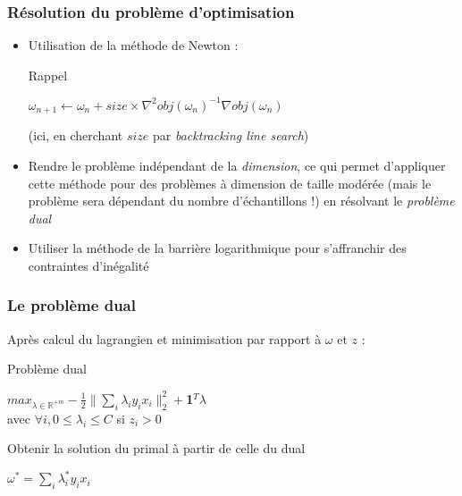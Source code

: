 \documentclass{beamer}
\begin{document}
\begin{frame}
\frametitle{Résolution du problème d'optimisation}

\begin{itemize}
\item Utilisation de la méthode de Newton :

\begin{block}{Rappel}
          \begin{center}
          $\omega_{n+1} \leftarrow \omega_{n} + size \times \nabla^2 obj(\omega_n)^{-1}\nabla obj(\omega_n)$
          \end{center}

  (ici, en cherchant $size$ par \emph{backtracking line search})
\end{block}

\item Rendre le problème indépendant de la \emph{dimension}, ce qui permet d'appliquer cette méthode pour des problèmes à dimension de taille modérée (mais le problème sera dépendant du nombre d'échantillons !) en résolvant le \emph{problème dual}

\item Utiliser la méthode de la barrière logarithmique pour s'affranchir des contraintes d'inégalité

\end{itemize}

\end{frame}

\begin{frame}
\frametitle{Le problème dual}

Après calcul du lagrangien et minimisation par rapport à $\omega$ et $z$ :

\begin{block}{Problème dual}
             \begin{center}
             $max_{\lambda \in \mathbb{R}^{+m}} -\frac{1}{2}\|\sum_i\lambda_iy_ix_i\|^2_2 + $\textbf{1}$^T\lambda$\\ 
             avec $\forall i, 0 \leq \lambda_i \leq C$ si $z_i > 0$\\
             \end{center}
\end{block}

\begin{block}{Obtenir la solution du primal à partir de celle du dual}
             \begin{center}
               $\omega^{*} = \sum_i \lambda^{*}_i y_i x_i$
             \end{center}
\end{block}

\end{frame}
\end{document}
